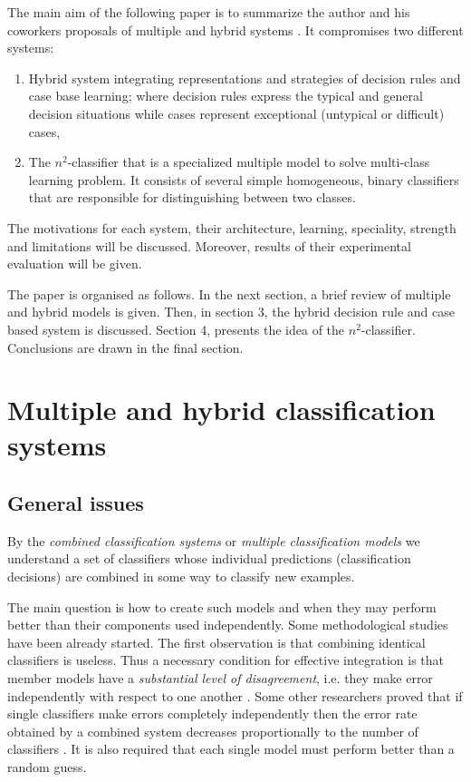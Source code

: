 \documentclass{article}
\begin{document}
The main aim of the following paper is to summarize the author and
his coworkers proposals of multiple and hybrid systems \cite
{JelStef97,JelStef98,JelStefKr,Wilk}. It compromises two different
systems:

\begin{enumerate}
\item  Hybrid system integrating representations and strategies of decision
rules and case base learning; where decision rules express the typical and
general decision situations while cases represent exceptional (untypical or
difficult) cases,

\item  The $n^{2}$-classifier that is a specialized multiple model to solve
multi-class learning problem. It consists of several simple
homogeneous, binary classifiers that are responsible for
distinguishing between two classes.
\end{enumerate}

The motivations for each system, their architecture, learning,
speciality, strength and limitations will be discussed. Moreover,
results of their experimental evaluation will be given.

The paper is organised as follows. In the next section, a brief review of
multiple and hybrid models is given. Then, in section 3, the hybrid decision
rule and case based system is discussed. Section 4, presents the idea of the
$n^2$-classifier. Conclusions are drawn in the final section.

\section{Multiple and hybrid classification systems}

\subsection{General issues}

By the {\em combined classification systems} or {\em multiple classification
models} we understand a set of classifiers whose individual predictions
(classification decisions) are combined in some way to classify new examples.

The main question is how to create such models and when they may
perform better than their components used independently. Some
methodological studies have been already started. The first
observation is that combining identical classifiers is useless.
Thus a necessary condition for effective integration is that
member models have a {\em substantial level of disagreement}, i.e.
they make error independently with respect to one another
\cite{HasSol}. Some other researchers proved that if single
classifiers make errors completely independently then the error
rate obtained by a combined system decreases proportionally to the
number of classifiers \cite{Ali,HasSol}. It is also required that
each single model must perform better than a random guess.
\end{document}
